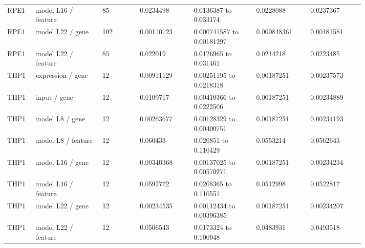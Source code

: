 \begin{longtable}{@{}L{0.06\linewidth}L{0.16\linewidth}L{0.09\linewidth}L{0.13\linewidth}L{0.15\linewidth}L{0.13\linewidth}L{0.13\linewidth}@{}}
RPE1 & model L16 / feature & 85 & 0.0234498 & 0.0136387 to 0.033174 & 0.0228088 & 0.0237367 \\
RPE1 & model L22 / gene & 102 & 0.00110123 & 0.000741587 to 0.00181297 & 0.000848361 & 0.00181581 \\
RPE1 & model L22 / feature & 85 & 0.022019 & 0.0126965 to 0.031461 & 0.0214218 & 0.0223485 \\
THP1 & expression / gene & 12 & 0.00911129 & 0.00251195 to 0.0218318 & 0.00187251 & 0.00237573 \\
THP1 & input / gene & 12 & 0.0109717 & 0.00410366 to 0.0222506 & 0.00187251 & 0.00234889 \\
THP1 & model L8 / gene & 12 & 0.00263677 & 0.00128329 to 0.00400751 & 0.00187251 & 0.00234193 \\
THP1 & model L8 / feature & 12 & 0.060433 & 0.020851 to 0.110429 & 0.0553214 & 0.0562643 \\
THP1 & model L16 / gene & 12 & 0.00340368 & 0.00137025 to 0.00570271 & 0.00187251 & 0.00234234 \\
THP1 & model L16 / feature & 12 & 0.0592772 & 0.0208365 to 0.110551 & 0.0512998 & 0.0522817 \\
THP1 & model L22 / gene & 12 & 0.00234535 & 0.00112434 to 0.00396385 & 0.00187251 & 0.00234207 \\
THP1 & model L22 / feature & 12 & 0.0506543 & 0.0173324 to 0.100948 & 0.0483931 & 0.0493518 \\
\end{longtable}
